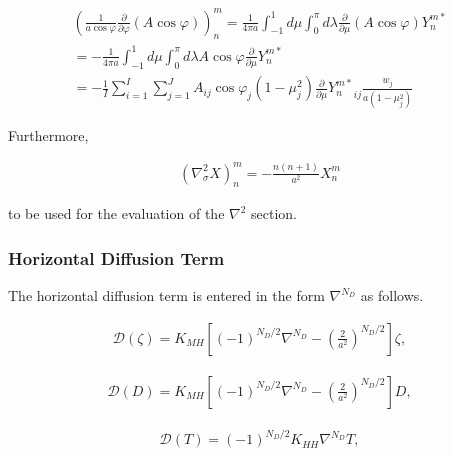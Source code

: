 \begin{eqnarray}
  \left( \frac{1}{a\cos\varphi} 
         \frac{\partial{}}{\partial {\varphi}} (A\cos\varphi) \right)_n^m 
    =  \frac{1}{4 \pi a} 
         \int_{-1}^{1} d \mu \int_{0}^{\pi} d \lambda 
           \frac{\partial{}}{\partial {\mu}} (A\cos\varphi) Y_n^{m *}  \\
    =  - \frac{1}{4 \pi a} 
         \int_{-1}^{1} d \mu \int_{0}^{\pi} d \lambda 
           A \cos\varphi \frac{\partial }{\partial \mu} Y_n^{m *}
            \\
   =  - \frac{1}{I} \sum_{i=1}^{I} \sum_{j=1}^{J}  
          A_{ij}  \cos\varphi_j
          (1-\mu_j^2)  \frac{\partial }{\partial \mu} 
          {Y_n^{m *}}_{ij} \frac{w_j}{a(1-\mu_j^{2})} 
\end{eqnarray}

Furthermore,

\begin{eqnarray}
     \left( \nabla^{2}_{\sigma} X \right)_n^m
       =  - \frac{n(n+1)}{a^{2}} X_n^m
\end{eqnarray}

to be used for the evaluation of the \(\nabla^2\) section.

\hypertarget{horizontal-diffusion-term}{%
\subsubsection{Horizontal Diffusion
Term}\label{horizontal-diffusion-term}}

The horizontal diffusion term is entered in the form \(\nabla^{N_D}\) as
follows.

\begin{eqnarray}
  {\mathcal D}(\zeta) = K_{MH} 
                      \left[ (-1)^{N_D/2} \nabla^{N_D}
                              - \left( \frac{2}{a^2} \right)^{N_D/2} 
                      \right]
                    \zeta ,
\end{eqnarray}

\begin{eqnarray}
     {\mathcal D}(D) = K_{MH} 
                      \left[ (-1)^{N_D/2} \nabla^{N_D}
                              - \left( \frac{2}{a^2} \right)^{N_D/2} 
                      \right]
                    D ,
\end{eqnarray}

\begin{eqnarray}
    {\mathcal D}(T) = (-1)^{N_D/2} K_{HH} \nabla^{N_D} T ,
\end{eqnarray}

